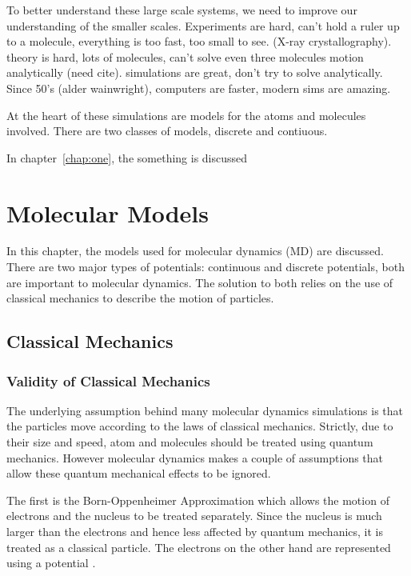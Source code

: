 \message{ !name(main.tex)}\documentclass[12pt]{UoAthesis}
\begin{document}
To better understand these large scale systems, we need to improve our
understanding of the smaller scales. Experiments are hard, can't hold
a ruler up to a molecule, everything is too fast, too small to
see. (X-ray crystallography). theory is hard, lots of molecules, can't
solve even three molecules motion analytically (need
cite). simulations are great, don't try to solve analytically. Since
50's (alder wainwright), computers are faster, modern sims are
amazing.

At the heart of these simulations are models for the atoms and
molecules involved. There are two classes of models, discrete and
contiuous.

In chapter~\ref{chap:one}, the something is discussed

\chapter{Molecular Models}
In this chapter, the models used for molecular dynamics (MD)
 are discussed. There are two
major types of potentials: continuous and discrete potentials, both
are important to molecular dynamics. The solution to both relies on
the use of classical mechanics to describe the motion of particles.

\section{Classical Mechanics}

\subsection{Validity of Classical Mechanics}

The underlying assumption behind many molecular dynamics simulations
is that the particles move according to the laws of classical
mechanics. Strictly, due to their size and speed, atom and molecules
should be treated using quantum mechanics.  However molecular dynamics
makes a couple of assumptions that allow these quantum mechanical
effects to be ignored.  

The first is the Born-Oppenheimer Approximation which allows the
motion of electrons and the nucleus to be treated separately.  Since
the nucleus is much larger than the electrons and hence less affected
by quantum mechanics, it is treated as a classical particle.  The
electrons on the other hand are represented using a potential \cite{Jasper2006}.
\end{document}
